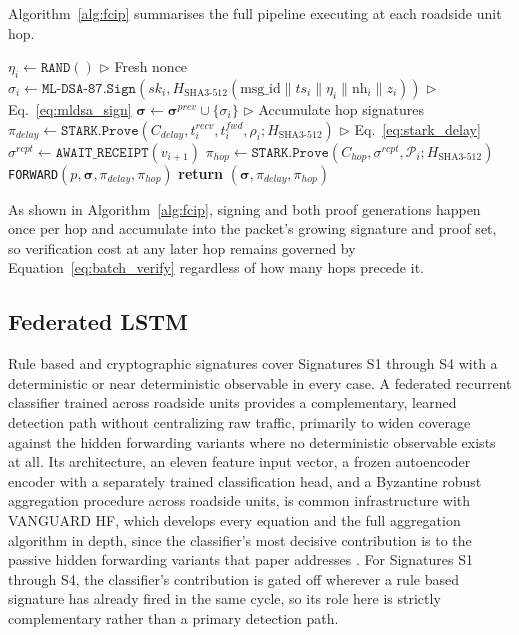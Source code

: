 \documentclass[final,5p,twocolumn]{elsarticle}
\renewcommand{\Comment}[1]{\hfill$\triangleright$ #1}
\theoremstyle{remark}
\theoremstyle{plain}
\begin{document}
Algorithm~\ref{alg:fcip} summarises the full pipeline executing at each
roadside unit hop.
\begin{algorithm}[!t]
	\caption{Full Cryptographic Integrity Pipeline (FCIP)}
	\label{alg:fcip}
	\begin{algorithmic}[1]
		\small
		\State $\eta_i \gets \texttt{RAND}()$ \Comment{Fresh nonce}
		\State $\sigma_i \gets \texttt{ML-DSA-87.Sign}(sk_i, H_{\text{SHA3-512}}(\text{msg\_id}\|ts_i\|\eta_i\|\text{nh}_i\|z_i))$ \Comment{Eq.~\eqref{eq:mldsa_sign}}
		\State $\boldsymbol{\sigma} \gets \boldsymbol{\sigma}^{prev} \cup \{\sigma_i\}$ \Comment{Accumulate hop signatures}
		\State $\pi_{delay} \gets \texttt{STARK.Prove}(C_{delay}, t^{recv}_i, t^{fwd}_i, \rho_i; H_{\text{SHA3-512}})$ \Comment{Eq.~\eqref{eq:stark_delay}}
		\State $\sigma^{rcpt} \gets \texttt{AWAIT\_RECEIPT}(v_{i+1})$
		\State $\pi_{hop} \gets \texttt{STARK.Prove}(C_{hop}, \sigma^{rcpt}, \mathcal{P}_i; H_{\text{SHA3-512}})$
		\State \texttt{FORWARD}$(p, \boldsymbol{\sigma}, \pi_{delay}, \pi_{hop})$
		\State \textbf{return} $(\boldsymbol{\sigma}, \pi_{delay}, \pi_{hop})$
		\EndProcedure
	\end{algorithmic}
\end{algorithm}
As shown in Algorithm~\ref{alg:fcip}, signing and both proof generations
happen once per hop and accumulate into the packet's growing signature and
proof set, so verification cost at any later hop remains governed by
Equation~\eqref{eq:batch_verify} regardless of how many hops precede it.


\subsection{Federated LSTM}
\label{sec:fed_lstm_brief}

Rule based and cryptographic signatures cover Signatures S1 through S4 with
a deterministic or near deterministic observable in every case. A federated
recurrent classifier trained across roadside units provides a complementary,
learned detection path without centralizing raw traffic, primarily to widen
coverage against the hidden forwarding variants where no deterministic
observable exists at all. Its architecture, an eleven feature input vector,
a frozen autoencoder encoder with a separately trained classification head,
and a Byzantine robust aggregation procedure across roadside units, is
common infrastructure with VANGUARD HF, which develops every equation and
the full aggregation algorithm in depth, since the classifier's most
decisive contribution is to the passive hidden forwarding variants that
paper addresses \cite{VanguardHF2026}. For Signatures S1 through S4, the
classifier's contribution is gated off wherever a rule based signature has
already fired in the same cycle, so its role here is strictly complementary
rather than a primary detection path.
\end{document}
